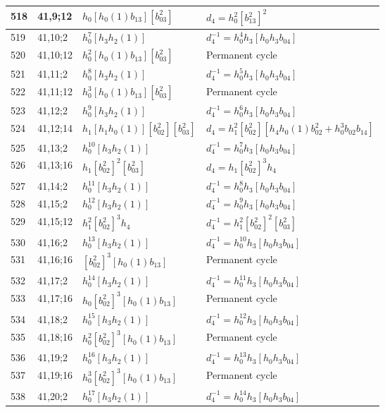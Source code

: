 \documentclass{article}
\begin{document}
\begin{longtable}{|l|l|>{\raggedright\arraybackslash}p{6cm}|>{\raggedright\arraybackslash}p{6cm}|}
\hline
518 & 41,9;12 & $h_0[h_0(1)b_{13}][b_{03}^2]$ &$d_{4}=h_0^2[b_{13}^2]^2$\\
\hline
519 & 41,10;2 & $h_0^7[h_3h_2(1)]$ & $d_{4}^{-1}=h_0^4h_3[h_0h_3b_{04}]$\\
\hline
520 & 41,10;12 & $h_0^2[h_0(1)b_{13}][b_{03}^2]$ & Permanent cycle\\
\hline
521 & 41,11;2 & $h_0^8[h_3h_2(1)]$ & $d_{4}^{-1}=h_0^5h_3[h_0h_3b_{04}]$\\
\hline
522 & 41,11;12 & $h_0^3[h_0(1)b_{13}][b_{03}^2]$ & Permanent cycle\\
\hline
523 & 41,12;2 & $h_0^9[h_3h_2(1)]$ & $d_{4}^{-1}=h_0^6h_3[h_0h_3b_{04}]$\\
\hline
524 & 41,12;14 & $h_1[h_1h_0(1)][b_{02}^2][b_{03}^2]$ &$d_{4}=h_1^2[b_{02}^2][h_4h_0(1)b_{02}^2 + h_0^3b_{02}b_{14}]$\\
\hline
525 & 41,13;2 & $h_0^{10}[h_3h_2(1)]$ & $d_{4}^{-1}=h_0^7h_3[h_0h_3b_{04}]$\\
\hline
526 & 41,13;16 & $h_1[b_{02}^2]^2[b_{03}^2]$ &$d_{4}=h_1[b_{02}^2]^3h_4$\\
\hline
527 & 41,14;2 & $h_0^{11}[h_3h_2(1)]$ & $d_{4}^{-1}=h_0^8h_3[h_0h_3b_{04}]$\\
\hline
528 & 41,15;2 & $h_0^{12}[h_3h_2(1)]$ & $d_{4}^{-1}=h_0^9h_3[h_0h_3b_{04}]$\\
\hline
529 & 41,15;12 & $h_1^2[b_{02}^2]^3h_4$ & $d_{4}^{-1}=h_1^2[b_{02}^2]^2[b_{03}^2]$\\
\hline
530 & 41,16;2 & $h_0^{13}[h_3h_2(1)]$ & $d_{4}^{-1}=h_0^{10}h_3[h_0h_3b_{04}]$\\
\hline
531 & 41,16;16 & $[b_{02}^2]^3[h_0(1)b_{13}]$ & Permanent cycle\\
\hline
532 & 41,17;2 & $h_0^{14}[h_3h_2(1)]$ & $d_{4}^{-1}=h_0^{11}h_3[h_0h_3b_{04}]$\\
\hline
533 & 41,17;16 & $h_0[b_{02}^2]^3[h_0(1)b_{13}]$ & Permanent cycle\\
\hline
534 & 41,18;2 & $h_0^{15}[h_3h_2(1)]$ & $d_{4}^{-1}=h_0^{12}h_3[h_0h_3b_{04}]$\\
\hline
535 & 41,18;16 & $h_0^2[b_{02}^2]^3[h_0(1)b_{13}]$ & Permanent cycle\\
\hline
536 & 41,19;2 & $h_0^{16}[h_3h_2(1)]$ & $d_{4}^{-1}=h_0^{13}h_3[h_0h_3b_{04}]$\\
\hline
537 & 41,19;16 & $h_0^3[b_{02}^2]^3[h_0(1)b_{13}]$ & Permanent cycle\\
\hline
538 & 41,20;2 & $h_0^{17}[h_3h_2(1)]$ & $d_{4}^{-1}=h_0^{14}h_3[h_0h_3b_{04}]$\\

\end{longtable}
\end{document}
